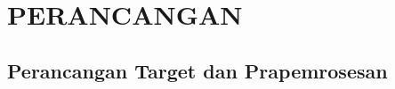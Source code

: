 %
%
%
\cleardoublepage
\chapter{PERANCANGAN}
\label{chap:perancangan}

\section{Perancangan Target dan Prapemrosesan}


